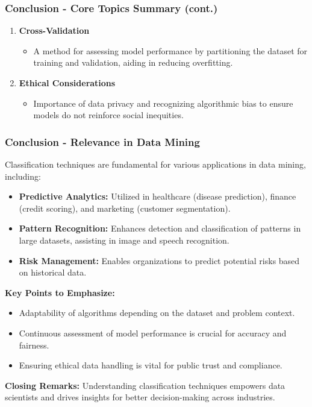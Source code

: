 \documentclass[aspectratio=169]{beamer}
\begin{document}
\begin{frame}[fragile]
    \frametitle{Conclusion - Core Topics Summary (cont.)}
    
    \begin{enumerate}[resume]
        \item \textbf{Cross-Validation}
        \begin{itemize}
            \item A method for assessing model performance by partitioning the dataset for training and validation, aiding in reducing overfitting.
        \end{itemize}

        \item \textbf{Ethical Considerations}
        \begin{itemize}
            \item Importance of data privacy and recognizing algorithmic bias to ensure models do not reinforce social inequities.
        \end{itemize}
    \end{enumerate}
\end{frame}

\begin{frame}[fragile]
    \frametitle{Conclusion - Relevance in Data Mining}
    
    Classification techniques are fundamental for various applications in data mining, including:
    
    \begin{itemize}
        \item \textbf{Predictive Analytics:} Utilized in healthcare (disease prediction), finance (credit scoring), and marketing (customer segmentation).
        \item \textbf{Pattern Recognition:} Enhances detection and classification of patterns in large datasets, assisting in image and speech recognition.
        \item \textbf{Risk Management:} Enables organizations to predict potential risks based on historical data.
    \end{itemize}

    \textbf{Key Points to Emphasize:}
    \begin{itemize}
        \item Adaptability of algorithms depending on the dataset and problem context.
        \item Continuous assessment of model performance is crucial for accuracy and fairness.
        \item Ensuring ethical data handling is vital for public trust and compliance.
    \end{itemize}
    
    \textbf{Closing Remarks:} Understanding classification techniques empowers data scientists and drives insights for better decision-making across industries.
\end{frame}
\end{document}
